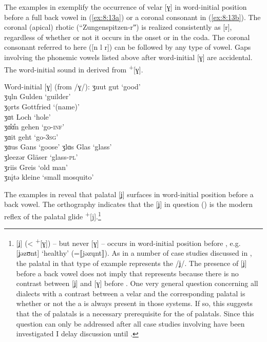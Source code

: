 The examples in  exemplify the occurrence of velar [ɣ] in word-initial position before a full back vowel in (\ref{ex:8:13a}) or a coronal consonant in (\ref{ex:8:13b}). The coronal (apical) rhotic (“Zungenspitzen-rˮ) is realized consistently as [r], regardless of whether or not it occurs in the onset or in the coda. The coronal consonant referred to here ([n l r]) can be followed by any type of vowel. Gaps involving the phonemic vowels listed above after word-initial [ɣ] are accidental. The word-initial sound in  derived from  \textsuperscript{+}[ɣ].

\ea%
    \label{ex:8:13}
          Word-initial [ɣ] (from /ɣ/):
\ea \label{ex:8:13a}ʒuut \tab [ɣuːt] \tab gut \tab ‘good’ \\
      ʒ\k{u}ln \tab  [ɣʊln] \tab Gulden \tab ‘guilder’ \\
      ʒǫrts \tab  [ɣɔrts] \tab Gottfried \tab ‘(name)’ \\
      ʒɑt \tab  [ɣɑt] \tab Loch \tab ‘hole’ \\
      ʒɑ̊ɑ̊n \tab [ɣɑːn] \tab gehen \tab ‘go\textsc{{}-inf}’ \\
      ʒɑit \tab [ɣɑit] \tab geht \tab ‘go\textsc{{}-3sg}’ \\
      ʒɑus \tab [ɣɑus] \tab Gans \tab ‘goose’ 
\ex   \label{ex:8:13b}ʒlɑs \tab  [ɣlɑs] \tab Glas \tab ‘glass’ \\
      ʒleezər \tab [ɣleːzər] \tab Gläser \tab ‘glass-\textsc{pl}’ \\
      ʒriis \tab [ɣriːs] \tab Greis \tab ‘old man’ \\
      ʒn\k{i}tə \tab [ɣnɪtə] \tab  kleine  \tab ‘small mosquito’ 
   \z
\z 

The examples in  reveal that palatal [ʝ] surfaces in word-initial position before a back vowel. The orthography indicates that the [ʝ] in question () is the modern reflex of the  palatal glide \textsuperscript{+}[j].\footnote{\label{fn:8:3}[ʝ] (< \textsuperscript{+}[ɣ]) -- but never [ɣ] -- occurs in word-initial position before , e.g. [ʝəzʊnt] ‘healthy’ (=⟦jəz\k{u}nt⟧). As in a number of case studies discussed in , the palatal in that type of example represents the  /ʝ/. The presence of [ʝ] before a back vowel does not imply that  represents  because there is no contrast between [ʝ] and [ɣ] before . One very general question concerning all dialects with a contrast between a velar and the corresponding palatal is whether or not the a  is always present in those systems. If so, this suggests that the  of palatals is a necessary prerequisite for the  of palatals. Since this question can only be addressed after all case studies involving  have been investigated I delay discussion until .}

